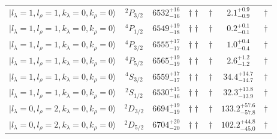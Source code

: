 \begin{tabular}{c c| c c c c c }
$\vert l_{\lambda}\!\!=\!1, l_{\rho}\!\!=\!1, k_{\lambda}\!\!=\!0, k_{\rho}\!\!=\!0 \rangle$ & $^{2}P_{3/2}$ & $6532^{+16}_{-16}$ & $\dagger\dagger$ & $\dagger$ & $2.1^{+0.9}_{-0.9}$ & $\dagger$ \\ 
$\vert l_{\lambda}\!\!=\!1, l_{\rho}\!\!=\!1, k_{\lambda}\!\!=\!0, k_{\rho}\!\!=\!0 \rangle$ & $^{4}P_{1/2}$ & $6549^{+19}_{-18}$ & $\dagger\dagger$ & $\dagger$ & $0.2^{+0.1}_{-0.1}$ & $\dagger$ \\ 
$\vert l_{\lambda}\!\!=\!1, l_{\rho}\!\!=\!1, k_{\lambda}\!\!=\!0, k_{\rho}\!\!=\!0 \rangle$ & $^{4}P_{3/2}$ & $6555^{+17}_{-17}$ & $\dagger\dagger$ & $\dagger$ & $1.0^{+0.4}_{-0.4}$ & $\dagger$ \\ 
$\vert l_{\lambda}\!\!=\!1, l_{\rho}\!\!=\!1, k_{\lambda}\!\!=\!0, k_{\rho}\!\!=\!0 \rangle$ & $^{4}P_{5/2}$ & $6565^{+19}_{-19}$ & $\dagger\dagger$ & $\dagger$ & $2.6^{+1.2}_{-1.2}$ & $\dagger$ \\ 
$\vert l_{\lambda}\!\!=\!1, l_{\rho}\!\!=\!1, k_{\lambda}\!\!=\!0, k_{\rho}\!\!=\!0 \rangle$ & $^{4}S_{3/2}$ & $6559^{+17}_{-17}$ & $\dagger\dagger$ & $\dagger$ & $34.4^{+14.7}_{-14.7}$ & $\dagger$ \\ 
$\vert l_{\lambda}\!\!=\!1, l_{\rho}\!\!=\!1, k_{\lambda}\!\!=\!0, k_{\rho}\!\!=\!0 \rangle$ & $^{2}S_{1/2}$ & $6530^{+15}_{-16}$ & $\dagger\dagger$ & $\dagger$ & $32.3^{+13.8}_{-13.9}$ & $\dagger$ \\ 
$\vert l_{\lambda}\!\!=\!0, l_{\rho}\!\!=\!2, k_{\lambda}\!\!=\!0, k_{\rho}\!\!=\!0 \rangle$ & $^{2}D_{3/2}$ & $6694^{+19}_{-19}$ & $\dagger\dagger$ & $\dagger$ & $133.2^{+57.6}_{-57.8}$ & $\dagger$ \\ 
$\vert l_{\lambda}\!\!=\!0, l_{\rho}\!\!=\!2, k_{\lambda}\!\!=\!0, k_{\rho}\!\!=\!0 \rangle$ & $^{2}D_{5/2}$ & $6704^{+20}_{-20}$ & $\dagger\dagger$ & $\dagger$ & $102.2^{+44.8}_{-45.0}$ & $\dagger$ \\ 
\hline \hline
\end{tabular}
